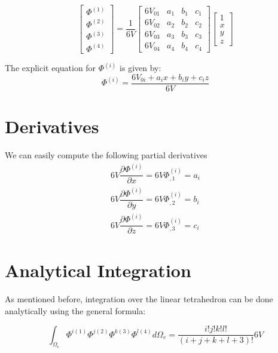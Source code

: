\documentclass[en]{minipw} %
\begin{document}
\begin{equation}
\begin{bmatrix}
\Phi^{(1)} \\
\Phi^{(2)} \\
\Phi^{(3)} \\
\Phi^{(4)}
\end{bmatrix}
=
\dfrac{1}{6V}
\begin{bmatrix}
6V_{01} & a_1 & b_1 & c_1 \\
6V_{02} & a_2 & b_2 & c_2 \\
6V_{03} & a_3 & b_3 & c_3 \\
6V_{04} & a_4 & b_4 & c_4
\end{bmatrix}
\begin{bmatrix}
1 \\
x \\
y \\
z
\end{bmatrix}
\end{equation}

The explicit equation for $\Phi^{(i)}$ is given by:
\begin{equation}
\Phi^{(i)} = \dfrac{6V_{0i} + a_i x + b_i y + c_i z}{6V}
\end{equation}

\section{Derivatives}

We can easily compute the following partial derivatives
\begin{equation}
\label{eq:tetra_partial_derivates}
\begin{aligned}
6V \dfrac{\partial \Phi^{(i)}}{\partial x} = 6V \Phi^{(i)}_{,1} = a_i
\\
6V \dfrac{\partial \Phi^{(i)}}{\partial y} = 6V \Phi^{(i)}_{,2} = b_i
\\
6V \dfrac{\partial \Phi^{(i)}}{\partial z} = 6V \Phi^{(i)}_{,3} = c_i
\end{aligned}
\end{equation}

\section{Analytical Integration}

As mentioned before, integration over the linear tetrahedron can be done analytically using the general formula:

\begin{equation}
\int_{\Omega_{e}} \Phi^{i(1)} \Phi^{j(2)} \Phi^{k(3)} \Phi^{l(4)} d \Omega_{e} = \dfrac{i!j!k!l!}{(i+j+k+l+3)!} 6V
\end{equation}
\end{document}
